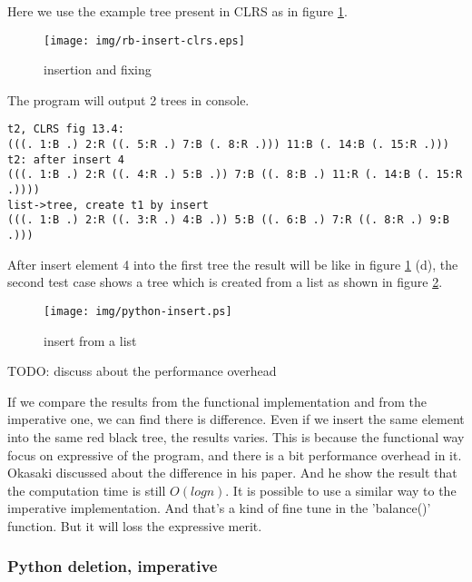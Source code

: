 \documentclass{article}
\begin{document}
Here we use the example tree present in CLRS as in figure \ref{fig:rb-insert-clrs}.

\begin{figure}[htbp]
       \begin{center}
	\texttt{[image: img/rb-insert-clrs.eps]}
        \caption{insertion and fixing} \label{fig:rb-insert-clrs}
       \end{center}
\end{figure}

The program will output 2 trees in console.

\begin{verbatim}
t2, CLRS fig 13.4:
(((. 1:B .) 2:R ((. 5:R .) 7:B (. 8:R .))) 11:B (. 14:B (. 15:R .)))
t2: after insert 4
(((. 1:B .) 2:R ((. 4:R .) 5:B .)) 7:B ((. 8:B .) 11:R (. 14:B (. 15:R .))))
list->tree, create t1 by insert
(((. 1:B .) 2:R ((. 3:R .) 4:B .)) 5:B ((. 6:B .) 7:R ((. 8:R .) 9:B .)))
\end{verbatim}

After insert element 4 into the first tree the result will be like in figure \ref{fig:rb-insert-clrs} (d), the second test case shows a tree which is created from a list as shown in figure \ref{fig:python-insert}.

\begin{figure}[htbp]
       \begin{center}
	\texttt{[image: img/python-insert.ps]}
        \caption{insert from a list} \label{fig:python-insert}
       \end{center}
\end{figure}

TODO: discuss about the performance overhead

If we compare the results from the functional implementation and from the imperative one, we can 
find there is difference. Even if we insert the same element into the same red black tree, the
results varies. This is because the functional way focus on expressive of the program, and there 
is a bit performance overhead in it. Okasaki discussed about the difference in his paper\cite{okasaki}.
And he show the result that the computation time is still $O(log n)$. It is possible to use a 
similar way to the imperative implementation. And that's a kind of fine tune in the 'balance()'
function. But it will loss the expressive merit.


\subsubsection*{Python deletion, imperative}
\end{document}
